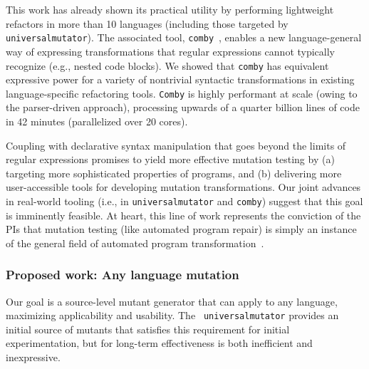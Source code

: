 This work has already shown its practical utility by performing lightweight
refactors in more than 10 languages (including those targeted by {\tt
  universalmutator}). The associated tool, {\tt comby}~\cite{comby-github},
enables a new language-general way of expressing transformations that regular
expressions cannot typically recognize (e.g., nested code blocks). We showed
that {\tt comby} has equivalent expressive power for a variety of nontrivial syntactic
transformations in existing language-specific refactoring tools. {\tt Comby} is
highly performant at scale (owing to the parser-driven approach), processing
upwards of a quarter billion lines of code in 42 minutes (parallelized over 20 cores).

Coupling with declarative syntax manipulation that goes beyond the limits
of regular expressions  promises to yield more effective mutation testing by (a) targeting more
sophisticated properties of programs, and (b) delivering more user-accessible
tools for developing mutation transformations. Our joint advances in
real-world tooling (i.e., in {\tt universalmutator} and {\tt comby}) suggest that
this goal is imminently feasible.  At heart, this line of work
represents the conviction of the PIs that mutation testing (like
automated program repair) is simply
an instance of the general field of automated program
transformation~\cite{Ptransform}.

\subsubsection{Proposed work: Any language mutation}
\label{subsubsection:any-language}

Our goal is a source-level mutant generator that can apply to any language,
maximizing applicability and usability.
 The {\tt
  universalmutator} provides an initial source of mutants that
satisfies this requirement for initial experimentation, but for
long-term effectiveness is both inefficient and inexpressive.


